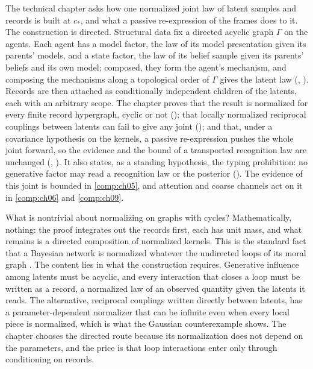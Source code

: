 The technical chapter asks how one normalized joint law of latent samples and records is built at $c_*$, and
what a passive re-expression of the frames does to it. The construction is directed. Structural data fix a
directed acyclic graph $\Gamma$ on the agents. Each agent has a model factor, the law of its model presentation
given its parents' models, and a state factor, the law of its belief sample given its parents' beliefs and its
own model; composed, they form the agent's mechanism, and composing the mechanisms along a topological order of
$\Gamma$ gives the latent law (, ). Records are then
attached as conditionally independent children of the latents, each with an arbitrary scope. The chapter proves
that the result is normalized for every finite record hypergraph, cyclic or not ();
that locally normalized reciprocal couplings between latents can fail to give any joint
(); and that, under a covariance hypothesis on the kernels, a passive
re-expression pushes the whole joint forward, so the evidence and the bound of a transported recognition law are
unchanged (, ). It also states,
as a standing hypothesis, the typing prohibition: no generative factor may read a recognition law or the
posterior (). The evidence of this joint is bounded in \cref{comp:ch05}, and
attention and coarse channels act on it in \cref{comp:ch06} and \cref{comp:ch09}.

What is nontrivial about normalizing on graphs with cycles? Mathematically, nothing: the proof integrates out the
records first, each has unit mass, and what remains is a directed composition of normalized kernels. This is the
standard fact that a Bayesian network is normalized whatever the undirected loops of its moral graph
\citep{Lauritzen1996}. The content lies in what the construction requires. Generative influence among latents
must be acyclic, and every interaction that closes a loop must be written as a record, a normalized law of an
observed quantity given the latents it reads. The alternative, reciprocal couplings written directly between
latents, has a parameter-dependent normalizer that can be infinite even when every local piece is normalized,
which is what the Gaussian counterexample shows. The chapter chooses the directed route because its
normalization does not depend on the parameters, and the price is that loop interactions enter only through
conditioning on records.

